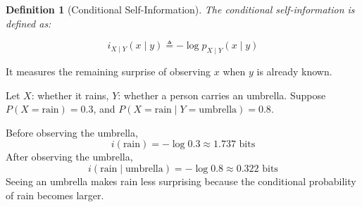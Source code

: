 \documentclass[11pt]{report}
\theoremstyle{lecturedefinition}
\newtheorem{definition}{Definition}
\theoremstyle{lectureremark}
\begin{document}
\begin{definition}[Conditional Self-Information]
The conditional self-information is defined as:

\begin{equation*}
    i_{X\mid Y}(x\mid y)\triangleq -\log p_{X\mid Y}(x\mid y)
\end{equation*}
\end{definition}
It measures the remaining surprise of observing $x$ when $y$ is already known.

\begin{ExampleBox}
Let $X$: whether it rains, $Y$: whether a person carries an umbrella. Suppose $P(X=\text{rain})=0.3$, and $P(X=\text{rain}\mid Y=\text{umbrella})=0.8$.

Before observing the umbrella,
\begin{equation*}
    i(\text{rain})=-\log 0.3\approx 1.737\text{ bits}
\end{equation*}
After observing the umbrella,
\begin{equation*}
    i(\text{rain}\mid \text{umbrella})=-\log 0.8\approx 0.322\text{ bits}
\end{equation*}
Seeing an umbrella makes rain less surprising because the conditional probability of rain becomes larger.
\end{ExampleBox}
\end{document}
